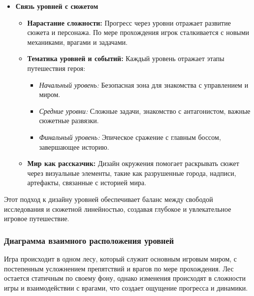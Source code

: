 \documentclass{article}
\begin{document}
\begin{itemize}
\item \textbf{Связь уровней с сюжетом}
\begin{itemize}
    \item \textbf{Нарастание сложности:} Прогресс через уровни отражает развитие сюжета и персонажа. По мере прохождения игрок сталкивается с новыми механиками, врагами и задачами.
    \item \textbf{Тематика уровней и событий:} Каждый уровень отражает этапы путешествия героя:
    \begin{itemize}
        \item \textit{Начальный уровень:} Безопасная зона для знакомства с управлением и миром.
        \item \textit{Средние уровни:} Сложные задачи, знакомство с антагонистом, важные сюжетные развязки.
        \item \textit{Финальный уровень:} Эпическое сражение с главным боссом, завершающее историю.
    \end{itemize}
    \item \textbf{Мир как рассказчик:} Дизайн окружения помогает раскрывать сюжет через визуальные элементы, такие как разрушенные города, надписи, артефакты, связанные с историей мира.
\end{itemize}
\end{itemize}
Этот подход к дизайну уровней обеспечивает баланс между свободой исследования и сюжетной линейностью, создавая глубокое и увлекательное игровое путешествие.

\subsubsection{Диаграмма взаимного расположения уровней}
Игра происходит в одном лесу, который служит основным игровым миром, с постепенным усложнением препятствий и врагов по мере прохождения. Лес остается статичным по своему фону, однако изменения происходят в сложности игры и взаимодействии с врагами, что создает ощущение прогресса и динамики.
\end{document}
